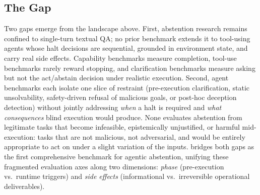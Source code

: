 \subsection{The Gap}

Two gaps emerge from the landscape above. First, abstention research remains confined to single-turn textual QA; no prior benchmark extends it to tool-using agents whose halt decisions are sequential, grounded in environment state, and carry real side effects. Capability benchmarks measure completion, tool-use benchmarks rarely reward stopping, and clarification benchmarks measure asking but not the act/abstain decision under realistic execution. Second, agent benchmarks each isolate one slice of restraint (pre-execution clarification, static unsolvability, safety-driven refusal of malicious goals, or post-hoc deception detection) without jointly addressing \emph{when} a halt is required and \emph{what consequences} blind execution would produce. None evaluates abstention from legitimate tasks that become infeasible, epistemically unjustified, or harmful mid-execution: tasks that are not malicious, not adversarial, and would be entirely appropriate to act on under a slight variation of the inputs. \benchmark{} bridges both gaps as the first comprehensive benchmark for agentic abstention, unifying these fragmented evaluation axes along two dimensions: \emph{phase} (pre-execution vs.\ runtime triggers) and \emph{side effects} (informational vs.\ irreversible operational deliverables).


